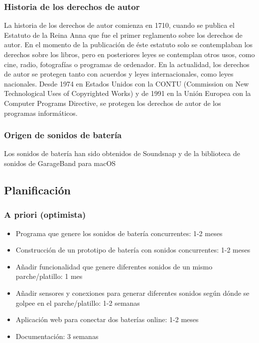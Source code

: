 \documentclass{article}
\begin{document}
\subsubsection{Historia de los derechos de autor}
La historia de los derechos de autor comienza en 1710, cuando se publica el Estatuto de la Reina
Anna\cite{estatuto_anna} que fue el primer reglamento sobre los derechos de autor. En el momento de la publicación
de éste estatuto solo se contemplaban los derechos sobre los libros, pero en posteriores leyes se contemplan otros
usos, como cine, radio, fotografías o programas de ordenador.\newline
En la actualidad, los derechos de autor se protegen tanto con acuerdos y leyes internacionales, como leyes
nacionales.\newline
Desde 1974 en Estados Unidos con la CONTU\cite{contu} (Commission on New Technological Uses of Copyrighted Works) y
de 1991 en la Unión Europea con la Computer Programs Directive\cite{com_pro_dir}, se protegen los derechos de autor
de los programas informáticos.

\subsubsection{Origen de sonidos de batería}
Los sonidos de batería han sido obtenidos de Soundsnap\cite{soundsnap} y de la biblioteca de sonidos de GarageBand
para macOS\cite{garageband}

\subsection{Planificación}

 \subsubsection{A priori (optimista)}

 \begin{itemize}
    \item
        Programa que genere los sonidos de batería concurrentes: 1-2 meses
    \item
        Construcción de un prototipo de batería con sonidos concurrentes: 1-2 meses
    \item
        Añadir funcionalidad que genere diferentes sonidos de un mismo parche/platillo: 1 mes
    \item
        Añadir sensores y conexiones para generar diferentes sonidos según dónde se golpee en el
        parche/platillo: 1-2 semanas
    \item
        Aplicación web para conectar dos baterías online: 1-2 meses
    \item
        Documentación: 3 semanas
\end{itemize}
\end{document}
